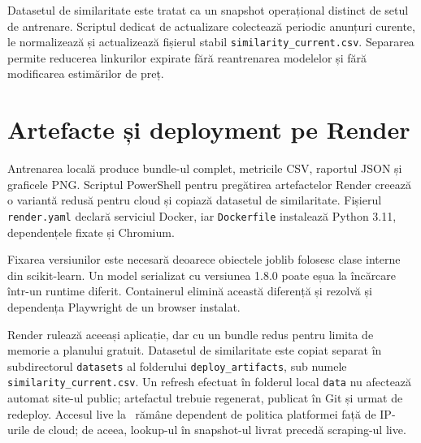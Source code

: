 Datasetul de similaritate este tratat ca un snapshot operațional distinct de setul de antrenare. Scriptul dedicat de actualizare colectează periodic anunțuri curente, le normalizează și actualizează fișierul stabil \texttt{similarity\_current.csv}. Separarea permite reducerea linkurilor expirate fără reantrenarea modelelor și fără modificarea estimărilor de preț.

\section{Artefacte și deployment pe Render}
\label{sec:implementation-deployment}

Antrenarea locală produce bundle-ul complet, metricile CSV, raportul JSON și graficele PNG. Scriptul PowerShell pentru pregătirea artefactelor Render creează o variantă redusă pentru cloud și copiază datasetul de similaritate. Fișierul \texttt{render.yaml} declară serviciul Docker, iar \texttt{Dockerfile} instalează Python 3.11, dependențele fixate și Chromium.

Fixarea versiunilor este necesară deoarece obiectele joblib folosesc clase interne din scikit-learn. Un model serializat cu versiunea 1.8.0 poate eșua la încărcare într-un runtime diferit. Containerul elimină această diferență și rezolvă și dependența Playwright de un browser instalat.

Render rulează aceeași aplicație, dar cu un bundle redus pentru limita de memorie a planului gratuit. Datasetul de similaritate este copiat separat în subdirectorul \texttt{datasets} al folderului \texttt{deploy\_artifacts}, sub numele \texttt{similarity\_current.csv}. Un refresh efectuat în folderul local \texttt{data} nu afectează automat site-ul public; artefactul trebuie regenerat, publicat în Git și urmat de redeploy. Accesul live la \mobilede\ rămâne dependent de politica platformei față de IP-urile de cloud; de aceea, lookup-ul în snapshot-ul livrat precedă scraping-ul live.
